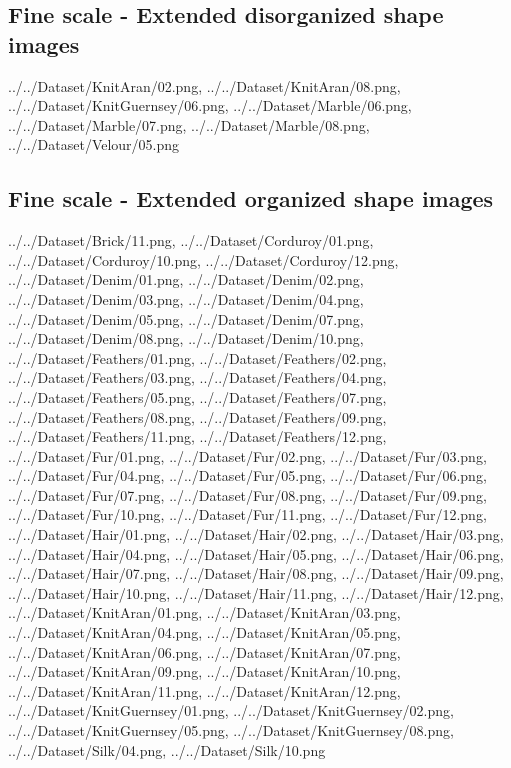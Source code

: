 \newpage
\subsection{Fine scale - Extended disorganized shape images}
{../../Dataset/KnitAran/02.png,
../../Dataset/KnitAran/08.png,
../../Dataset/KnitGuernsey/06.png,
../../Dataset/Marble/06.png,
../../Dataset/Marble/07.png,
../../Dataset/Marble/08.png,
../../Dataset/Velour/05.png}

\newpage
\subsection{Fine scale - Extended organized shape images}
{../../Dataset/Brick/11.png,
../../Dataset/Corduroy/01.png,
../../Dataset/Corduroy/10.png,
../../Dataset/Corduroy/12.png,
../../Dataset/Denim/01.png,
../../Dataset/Denim/02.png,
../../Dataset/Denim/03.png,
../../Dataset/Denim/04.png,
../../Dataset/Denim/05.png,
../../Dataset/Denim/07.png,
../../Dataset/Denim/08.png,
../../Dataset/Denim/10.png,
../../Dataset/Feathers/01.png,
../../Dataset/Feathers/02.png,
../../Dataset/Feathers/03.png,
../../Dataset/Feathers/04.png,
../../Dataset/Feathers/05.png,
../../Dataset/Feathers/07.png,
../../Dataset/Feathers/08.png,
../../Dataset/Feathers/09.png,
../../Dataset/Feathers/11.png,
../../Dataset/Feathers/12.png,
../../Dataset/Fur/01.png,
../../Dataset/Fur/02.png,
../../Dataset/Fur/03.png,
../../Dataset/Fur/04.png,
../../Dataset/Fur/05.png,
../../Dataset/Fur/06.png,
../../Dataset/Fur/07.png,
../../Dataset/Fur/08.png,
../../Dataset/Fur/09.png,
../../Dataset/Fur/10.png,
../../Dataset/Fur/11.png,
../../Dataset/Fur/12.png,
../../Dataset/Hair/01.png,
../../Dataset/Hair/02.png,
../../Dataset/Hair/03.png,
../../Dataset/Hair/04.png,
../../Dataset/Hair/05.png,
../../Dataset/Hair/06.png,
../../Dataset/Hair/07.png,
../../Dataset/Hair/08.png,
../../Dataset/Hair/09.png,
../../Dataset/Hair/10.png,
../../Dataset/Hair/11.png,
../../Dataset/Hair/12.png,
../../Dataset/KnitAran/01.png,
../../Dataset/KnitAran/03.png,
../../Dataset/KnitAran/04.png,
../../Dataset/KnitAran/05.png,
../../Dataset/KnitAran/06.png,
../../Dataset/KnitAran/07.png,
../../Dataset/KnitAran/09.png,
../../Dataset/KnitAran/10.png,
../../Dataset/KnitAran/11.png,
../../Dataset/KnitAran/12.png,
../../Dataset/KnitGuernsey/01.png,
../../Dataset/KnitGuernsey/02.png,
../../Dataset/KnitGuernsey/05.png,
../../Dataset/KnitGuernsey/08.png,
../../Dataset/Silk/04.png,
../../Dataset/Silk/10.png}

